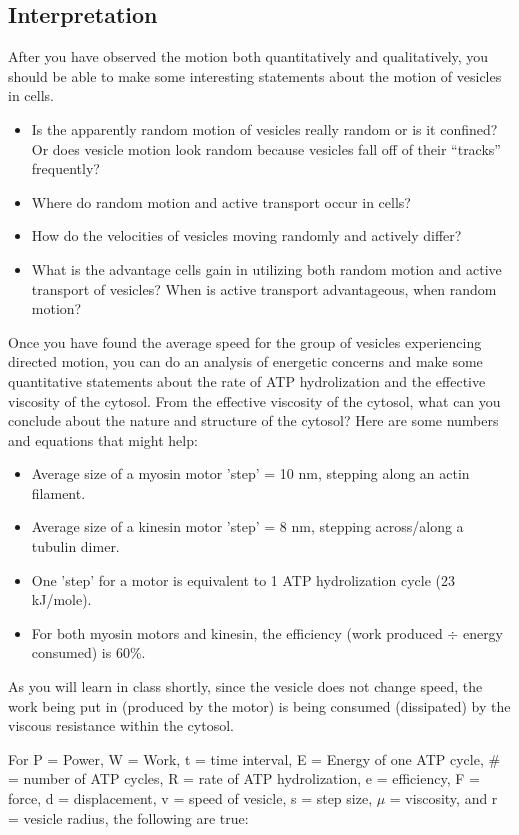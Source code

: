 \subsection*{Interpretation}
After you have observed the motion both quantitatively and qualitatively, you should be able to make some interesting statements about the motion of vesicles in cells.
\begin{itemize}
\item Is the apparently random motion of vesicles really random or is it confined? Or does vesicle motion look random because vesicles fall off of their ``tracks'' frequently?
\item Where do random motion and active transport occur in cells?
\item How do the velocities of vesicles moving randomly and actively differ?
\item What is the advantage cells gain in utilizing both random motion and active transport of vesicles? When is active transport advantageous, when random motion?
\end{itemize}
Once you have found the average speed for the group of vesicles experiencing directed motion, you can do an analysis of energetic concerns and make some quantitative statements about the rate of ATP hydrolization and the effective viscosity of the cytosol. From the effective viscosity of the cytosol, what can you conclude about the nature and structure of the cytosol? Here are some numbers and equations that might help:
\begin{itemize}
\item Average size of a myosin motor 'step' = 10 nm, stepping along an actin filament.
\item Average size of a kinesin motor 'step' = 8 nm, stepping across/along a tubulin dimer.
\item One 'step' for a motor is equivalent to 1 ATP hydrolization cycle (23 kJ/mole).
\item For both myosin motors and kinesin, the efficiency (work produced $\div$ energy consumed) is 60\%.
\end{itemize}
As you will learn in class shortly, since the vesicle does not change speed, the work being put in (produced by the motor) is being consumed (dissipated) by the viscous resistance within the cytosol.

\newpage

For P = Power, W = Work, t = time interval, E = Energy of one ATP cycle, \# = number of ATP cycles, R = rate of ATP hydrolization, e = efficiency, F = force, d = displacement, v = speed of vesicle, s = step size, $\mu$ = viscosity, and r = vesicle radius, the following are true:

